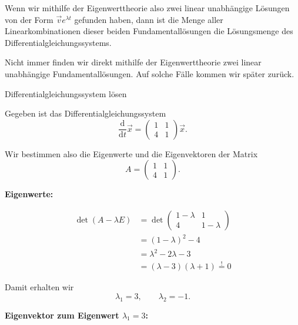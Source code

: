 Wenn wir mithilfe der Eigenwerttheorie also zwei linear
unabhängige Lösungen von der Form
\(\vec{v}e^{\lambda t}\) gefunden haben, dann ist die Menge
aller Linearkombinationen dieser beiden Fundamentallösungen
die Lösungsmenge des Differentialgleichungssystems.

Nicht immer finden wir direkt mithilfe der Eigenwerttheorie
zwei linear unabhängige Fundamentallösungen.
Auf solche Fälle kommen wir später zurück.


\begin{bsp}{Differentialgleichungssystem lösen}{}

    Gegeben ist das Differentialgleichungssystem
    \[
        \frac{\mathrm{d}}{\mathrm{d}t}\vec{x}
        =
        \begin{pmatrix}
            1 & 1 \\
            4 & 1
        \end{pmatrix}
        \vec{x}.
    \]

    Wir bestimmen also die Eigenwerte und die Eigenvektoren der Matrix
    \[
        A=
        \begin{pmatrix}
            1 & 1 \\
            4 & 1
        \end{pmatrix}.
    \]

    \textbf{Eigenwerte:}

    \begin{align*}
        \det(A-\lambda E)
         & =
        \det
        \begin{pmatrix}
            1-\lambda & 1         \\
            4         & 1-\lambda
        \end{pmatrix}  \\
         & =(1-\lambda)^2-4        \\
         & =\lambda^2-2\lambda-3   \\
         & =(\lambda-3)(\lambda+1)
        \stackrel{!}{=}0
    \end{align*}

    Damit erhalten wir
    \[
        \lambda_1=3,
        \qquad
        \lambda_2=-1.
    \]

    \textbf{Eigenvektor zum Eigenwert \(\lambda_1=3\):}


\end{bsp}
